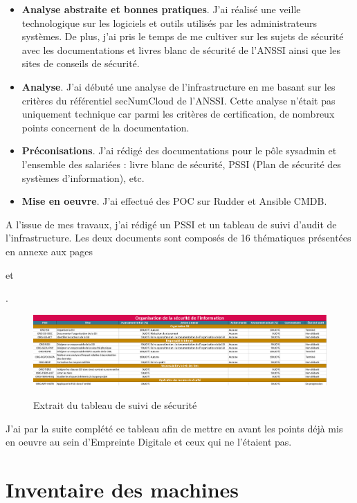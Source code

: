 \documentclass[12pt, a4paper, twoside]{article}
\begin{document}
\begin{itemize}
    \item \textbf{Analyse abstraite et bonnes pratiques}. J'ai réalisé une veille technologique sur les logiciels et outils utilisés par les administrateurs systèmes. 
    De plus, j'ai pris le temps de me cultiver sur les sujets de sécurité avec les documentations et livres blanc de sécurité de l'\gls{ANSSI} ainsi que les sites de conseils de sécurité.
    \item \textbf{Analyse}. J'ai débuté une analyse de l'infrastructure en me basant sur les critères du référentiel secNumCloud de l'\gls{ANSSI}. 
    Cette analyse n'était pas uniquement technique car parmi les critères de certification, de nombreux points concernent de la documentation.
    \item \textbf{Préconisations}. J'ai rédigé des documentations pour le pôle \gls{sysadmin} et l'ensemble des salariées : livre blanc de sécurité, \gls{PSSI} (Plan de sécurité des systèmes d'information), etc.
    \item \textbf{Mise en oeuvre}. J'ai effectué des \gls{POC} sur Rudder et \gls{Ansible CMDB}.
\end{itemize}

A l'issue de mes travaux, j'ai rédigé un \gls{PSSI} et un tableau de suivi d'audit de l'infrastructure. 
Les deux documents sont composés de 16 thématiques présentées en annexe aux pages \begin{hilite} \pageref{tab:16thematiques1} \end{hilite} et \begin{hilite} \pageref{tab:16thematiques2} \end{hilite}.
\begin{figure}[!ht]
    \centering
    \includegraphics[width=\textwidth]{src/table_ssi.png}
    \label{fig:pssi_table}
    \caption{Extrait du tableau de suivi de sécurité}
\end{figure}

J'ai par la suite complété ce tableau afin de mettre en avant les points déjà mis en oeuvre au sein d'Empreinte Digitale et ceux qui ne l'étaient pas.

\newpage
\section{Inventaire des machines}
\end{document}
